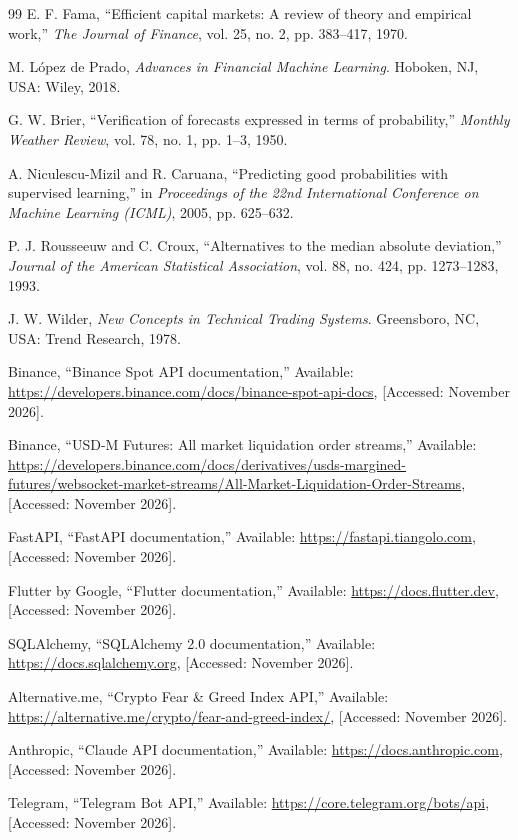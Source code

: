 \begin{thebibliography}{99}
E. F. Fama, ``Efficient capital markets: A review of theory and empirical work,'' \textit{The Journal of Finance}, vol. 25, no. 2, pp. 383--417, 1970.

M. L\'opez de Prado, \textit{Advances in Financial Machine Learning}. Hoboken, NJ, USA: Wiley, 2018.

G. W. Brier, ``Verification of forecasts expressed in terms of probability,'' \textit{Monthly Weather Review}, vol. 78, no. 1, pp. 1--3, 1950.

A. Niculescu-Mizil and R. Caruana, ``Predicting good probabilities with supervised learning,'' in \textit{Proceedings of the 22nd International Conference on Machine Learning (ICML)}, 2005, pp. 625--632.

P. J. Rousseeuw and C. Croux, ``Alternatives to the median absolute deviation,'' \textit{Journal of the American Statistical Association}, vol. 88, no. 424, pp. 1273--1283, 1993.

J. W. Wilder, \textit{New Concepts in Technical Trading Systems}. Greensboro, NC, USA: Trend Research, 1978.

Binance, ``Binance Spot API documentation,'' Available: \url{https://developers.binance.com/docs/binance-spot-api-docs}, [Accessed: November 2026].

Binance, ``USD-M Futures: All market liquidation order streams,'' Available: \url{https://developers.binance.com/docs/derivatives/usds-margined-futures/websocket-market-streams/All-Market-Liquidation-Order-Streams}, [Accessed: November 2026].

FastAPI, ``FastAPI documentation,'' Available: \url{https://fastapi.tiangolo.com}, [Accessed: November 2026].

Flutter by Google, ``Flutter documentation,'' Available: \url{https://docs.flutter.dev}, [Accessed: November 2026].

SQLAlchemy, ``SQLAlchemy 2.0 documentation,'' Available: \url{https://docs.sqlalchemy.org}, [Accessed: November 2026].

Alternative.me, ``Crypto Fear \& Greed Index API,'' Available: \url{https://alternative.me/crypto/fear-and-greed-index/}, [Accessed: November 2026].

Anthropic, ``Claude API documentation,'' Available: \url{https://docs.anthropic.com}, [Accessed: November 2026].

Telegram, ``Telegram Bot API,'' Available: \url{https://core.telegram.org/bots/api}, [Accessed: November 2026].

\end{thebibliography}
\let\chapter\origchapter
